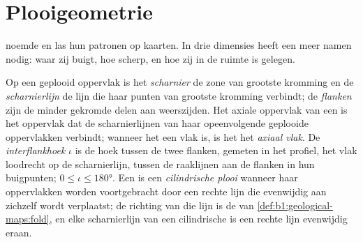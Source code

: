 \section{Plooigeometrie}\label{sec:b1:faults-folds-fabrics:folds}

 noemde  en las hun patronen op kaarten. In drie dimensies heeft een  meer namen nodig: waar zij buigt, hoe scherp, en hoe zij in de ruimte is gelegen.

\begin{definition}\label{def:b1:faults-folds-fabrics:fold-elements}
Op een geplooid oppervlak is het \emph{scharnier} de zone van grootste kromming en de \emph{scharnierlijn} de lijn die haar punten van grootste kromming verbindt; de \emph{flanken} zijn de minder gekromde delen aan weerszijden. Het axiale oppervlak van een  is het oppervlak dat de scharnierlijnen van haar opeenvolgende geplooide oppervlakken verbindt;
wanneer het een vlak is, is het het \emph{axiaal vlak}. De \emph{interflankhoek} $\iota$ is de hoek tussen de twee flanken, gemeten in het profiel, het vlak loodrecht op de scharnierlijn, tussen de raaklijnen aan de flanken in hun buigpunten;
$0 \le \iota \le \ang{180}$. Een  is een \emph{cilindrische plooi} wanneer haar oppervlakken worden voortgebracht door een rechte lijn die evenwijdig aan zichzelf wordt verplaatst; de richting van die lijn is de  van \cref{def:b1:geological-maps:fold}, en elke scharnierlijn van een cilindrische  is een rechte lijn evenwijdig eraan.
\end{definition}


